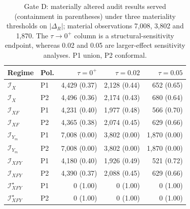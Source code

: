 \begin{table}[!tbp]
\caption{Gate D: materially altered audit results served (containment in parentheses) under three materiality thresholds on $|\Delta_R|$; material observations 7,008, 3,802 and 1,870. The $\tau\to0^{+}$ column is a structural-sensitivity endpoint, whereas 0.02 and 0.05 are larger-effect sensitivity analyses. P1 union, P2 conformal.}
\label{tab:s-policy-tau}
\centering
\scriptsize
\setlength{\tabcolsep}{2.5pt}
\begin{tabular}{@{}llrrr@{}}
\toprule
Regime & Pol. & $\tau=0^{+}$ & $\tau=0.02$ & $\tau=0.05$ \\
\midrule
$\mathcal I_X$ & P1 & 4,429 (0.37) & 2,128 (0.44) & 652 (0.65) \\
$\mathcal I_X$ & P2 & 4,496 (0.36) & 2,174 (0.43) & 680 (0.64) \\
$\mathcal I_{XF}$ & P1 & 4,231 (0.40) & 1,977 (0.48) & 566 (0.70) \\
$\mathcal I_{XF}$ & P2 & 4,365 (0.38) & 2,074 (0.45) & 629 (0.66) \\
$\mathcal I_{Y_m}$ & P1 & 7,008 (0.00) & 3,802 (0.00) & 1,870 (0.00) \\
$\mathcal I_{Y_m}$ & P2 & 7,008 (0.00) & 3,802 (0.00) & 1,870 (0.00) \\
$\mathcal I_{XFY}$ & P1 & 4,180 (0.40) & 1,926 (0.49) & 521 (0.72) \\
$\mathcal I_{XFY}$ & P2 & 4,390 (0.37) & 2,088 (0.45) & 629 (0.66) \\
$\mathcal I_{XFY}^{\star}$ & P1 & 0 (1.00) & 0 (1.00) & 0 (1.00) \\
$\mathcal I_{XFY}^{\star}$ & P2 & 0 (1.00) & 0 (1.00) & 0 (1.00) \\
\bottomrule
\end{tabular}
\end{table}
